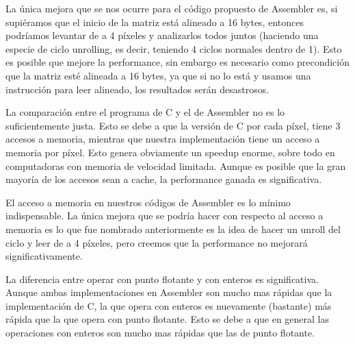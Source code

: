 La única mejora que se nos ocurre para el código propuesto de Assembler es, si supiéramos que el inicio de la matriz está alineado a 16 bytes, entonces podríamos levantar de a 4 píxeles y analizarlos todos juntos (haciendo una especie de ciclo unrolling, es decir, teniendo 4 ciclos normales dentro de 1).
Esto es posible que mejore la performance, sin embargo es necesario como precondición que la matriz esté alineada a 16 bytes, ya que si no lo está y usamos una instrucción para leer alineado, los resultados serán desastrosos.

La comparación entre el programa de C y el de Assembler no es lo suficientemente justa. Esto se debe a que la versión de C por cada píxel, tiene 3 accesos a memoria, mientras que nuestra implementación tiene un acceso a memoria por píxel. Esto genera obviamente un speedup enorme, sobre todo en computadoras con memoria de velocidad limitada.
Aunque es posible que la gran mayoría de los accesos sean a cache, la performance ganada es significativa.

El acceso a memoria en nuestros códigos de Assembler es lo mínimo indispensable. La única mejora que se podría hacer con respecto al acceso a memoria es lo que fue nombrado anteriormente es la idea de hacer un unroll del ciclo y leer de a 4 píxeles, pero creemos que la performance no mejorará significativamente.

La diferencia entre operar con punto flotante y con enteros es significativa. Aunque ambas implementaciones en Assembler son mucho mas rápidas que la implementación de C, la que opera con enteros es nuevamente (bastante) más rápida que la que opera con punto flotante. Esto se debe a que en general las operaciones con enteros son mucho mas rápidas que las de punto flotante.





